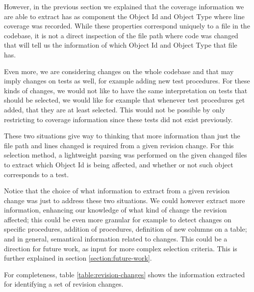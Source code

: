 \documentclass{article}
\begin{document}
However, in the previous section we explained that the coverage information we are able to extract has as component the Object Id and Object Type where line coverage was recorded. While these properties correspond uniquely to a file in the codebase, it is not a direct inspection of the file path where code was changed that will tell us the information of which Object Id and Object Type that file has.

Even more, we are considering changes on the whole codebase and that may imply changes on tests as well, for example adding new test procedures. For these kinds of changes, we would not like to have the same interpretation on tests that should be selected, we would like for example that whenever test procedures get added, that they are at least selected. This would not be possible by only restricting to coverage information since these tests did not exist previously.

These two situations give way to thinking that more information than just the file path and lines changed is required from a given revision change. For this selection method, a lightweight parsing was performed on the given changed files to extract which Object Id is being affected, and whether or not such object corresponds to a test.

Notice that the choice of what information to extract from a given revision change was just to address these two situations. We could however extract more information, enhancing our knowledge of what kind of change the revision affected; this could be even more granular for example to detect changes on specific procedures, addition of procedures, definition of new columns on a table; and in general, semantical information related to changes. This could be a direction for future work, as input for more complex selection criteria. This is further explained in section \ref{section:future-work}.

For completeness, table \ref{table:revision-changes} shows the information extracted for identifying a set of revision changes. 
\end{document}
